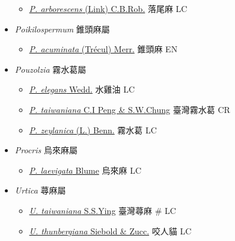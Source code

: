 \begin{itemize}
  \begin{itemize}
        \item[] \href{http://www.theplantlist.org/tpl1.1/search?q=Pipturus+arborescens}{\textit{P. arborescens} (Link) C.B.Rob.}   落尾麻   LC
  \end{itemize}
 \item[] \textit{Poikilospermum} 錐頭麻屬
                                
  \begin{itemize}
        \item[] \href{http://www.theplantlist.org/tpl1.1/search?q=Poikilospermum+acuminata}{\textit{P. acuminata} (Trécul) Merr.}   錐頭麻   EN
  \end{itemize}
 \item[] \textit{Pouzolzia} 霧水葛屬
                                
  \begin{itemize}
        \item[] \href{http://www.theplantlist.org/tpl1.1/search?q=Pouzolzia+elegans}{\textit{P. elegans} Wedd.}   水雞油   LC
        \item[] \href{http://www.theplantlist.org/tpl1.1/search?q=Pouzolzia+taiwaniana}{\textit{P. taiwaniana} C.I Peng \& S.W.Chung}   臺灣霧水葛   CR
        \item[] \href{http://www.theplantlist.org/tpl1.1/search?q=Pouzolzia+zeylanica}{\textit{P. zeylanica} (L.) Benn.}   霧水葛   LC
  \end{itemize}
 \item[] \textit{Procris} 烏來麻屬
                                
  \begin{itemize}
        \item[] \href{http://www.theplantlist.org/tpl1.1/search?q=Procris+laevigata}{\textit{P. laevigata} Blume}   烏來麻   LC
  \end{itemize}
 \item[] \textit{Urtica} 蕁麻屬
                                
  \begin{itemize}
        \item[] \href{http://www.theplantlist.org/tpl1.1/search?q=Urtica+taiwaniana}{\textit{U. taiwaniana} S.S.Ying}   臺灣蕁麻  \# LC
        \item[] \href{http://www.theplantlist.org/tpl1.1/search?q=Urtica+thunbergiana}{\textit{U. thunbergiana} Siebold \& Zucc.}   咬人貓   LC
  \end{itemize}
  \end{itemize}
